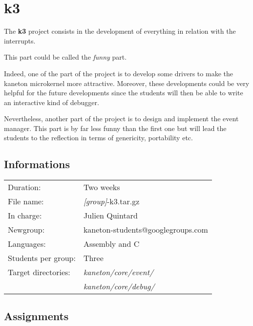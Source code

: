 
%
%

\chapter{k3}

The \textbf{k3} project consists in the development of everything in
relation with the interrupts.

This part could be called the \textit{funny} part.

Indeed, one of the part of the project is to develop some drivers to
make the kaneton microkernel more attractive. Moreover, these developments
could be very helpful for the future developments since the students will
then be able to write an interactive kind of debugger.

Nevertheless, another part of the project is to design and implement
the event manager. This part is by far less funny than the first one
but will lead the students to the reflection in terms of genericity,
portability etc.

\newpage

%
%

\section{Informations}

\begin{tabular}{p{7cm}l}
Duration: & Two weeks \\
File name: & \textit{[group]}-k3.tar.gz \\
In charge: & Julien Quintard \\
Newgroup: & kaneton-students@googlegroups.com \\
Languages: & Assembly and C \\
Students per group: & Three \\
Target directories:
  & \textit{kaneton/core/event/} \\
  & \textit{kaneton/core/debug/} \\
\end{tabular}

%
%

\section{Assignments}


